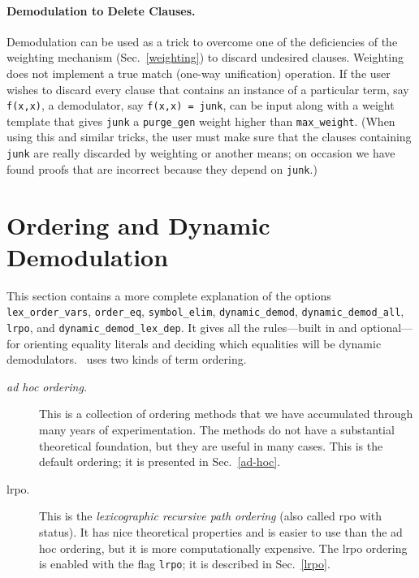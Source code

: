 \documentclass[11pt]{article}
\begin{document}
\paragraph{Demodulation to Delete Clauses.}
Demodulation can
be used as a trick to overcome one of the deficiencies of the
weighting mechanism (Sec.~\ref{weighting}) to discard undesired
clauses.  Weighting does not implement a true match (one-way
unification) operation.  If the user wishes to discard every clause
that contains an instance of a particular term, say \verb:f(x,x):, a
demodulator, say \verb:f(x,x) = junk:, can be input along with a weight
template that gives \verb:junk: a \verb:purge_gen: weight higher than
\verb:max_weight:.  (When using this and similar tricks,
the user must make sure that the clauses containing \verb:junk: are really
discarded by weighting or another means; on occasion we have
found proofs that are incorrect because they depend on \verb:junk:.)

\section{Ordering and Dynamic Demodulation} \label{ordering}

\begin{sloppypar}
This section contains a more complete explanation of the options
\verb:lex_order_vars:, \verb:order_eq:, \verb:symbol_elim:,
\verb:dynamic_demod:, \verb:dynamic_demod_all:, \verb:lrpo:, and
\verb:dynamic_demod_lex_dep:.  It gives all the rules---built in and
optional---for orienting equality literals and deciding which
equalities will be dynamic demodulators.  \otter\ uses two kinds
of term ordering.
\begin{description}
\item[{\it ad hoc ordering.}]  This is a collection of ordering
methods that we have accumulated through many years of experimentation.
The methods do not have a substantial theoretical foundation, but they are
useful in many cases.  This is the default ordering; it is
presented in Sec.~\ref{ad-hoc}.
\item[{\sc lrpo}.]  This is the {\em lexicographic recursive path
ordering} (also called {\sc rpo} with status).  It has nice theoretical
properties and is easier to use than the ad hoc ordering, but it is
more computationally expensive.  The {\sc lrpo} ordering is enabled
with the flag \verb:lrpo:;  it is described in Sec.~\ref{lrpo}.
\end{description}
\end{sloppypar}
\end{document}
